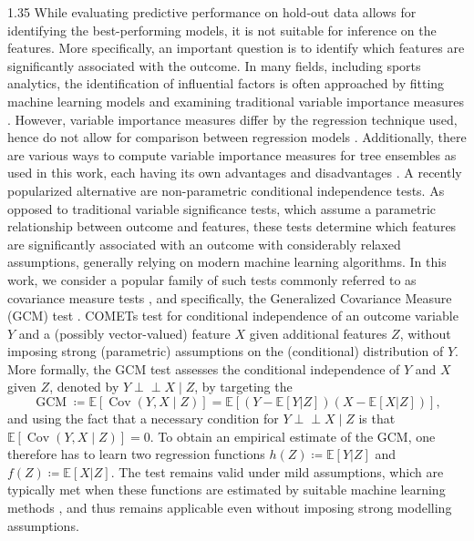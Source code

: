 \documentclass[12pt,a4paper]{article}
\begin{document}
\begin{spacing}{1.35}
While evaluating predictive performance on hold-out data allows for identifying the best-performing models, it is not suitable for inference on the features. More specifically, an important question is to identify which features are significantly associated with the outcome. %
In many fields, including sports analytics, the identification of influential factors is often approached by fitting machine learning models and examining traditional variable importance measures \citep{bajons2025mlsi}. However, variable importance measures differ by the regression technique used, hence do not allow for comparison between regression models \citep{williamson20varimp}. Additionally, there are various ways to compute variable importance measures for tree ensembles as used in this work, each having its own advantages and disadvantages \citep{Strobl08varimp}. A recently popularized alternative are non-parametric conditional independence tests. As opposed to traditional variable significance tests, which assume a parametric relationship between outcome and features, these tests determine which features are significantly associated with an outcome with considerably relaxed assumptions, generally relying on modern machine learning algorithms. In this work, we consider a popular family of such tests commonly referred to as covariance measure tests \citep[COMETs, see, e.g.,][]{kook24comets}, and specifically, the Generalized Covariance Measure (GCM) test \citep{Shah20gcm}. COMETs test for conditional independence of an outcome variable $Y$ and a (possibly vector-valued) feature $X$ given additional features $Z$, without imposing strong (parametric) assumptions on the (conditional) distribution of $Y$.
More formally, the GCM test assesses the conditional independence of $Y$ and $X$ given $Z$, denoted by $Y \perp\!\!\!\perp X \mid Z$, by targeting the 
\begin{equation}\label{eq:GCM}
\operatorname{GCM} \coloneqq \mathbb{E}[\operatorname{Cov}(Y,X \mid Z)] =\mathbb{E}[(Y -
\mathbb{E}[Y | Z])(X - \mathbb{E}[X | Z])],
\end{equation}
and using the fact that a necessary condition for $Y \perp\!\!\!\perp X \mid Z$ is that $\mathbb{E}[\operatorname{Cov}(Y,X \mid Z)] = 0$. To obtain an empirical estimate of the GCM, one therefore has to learn two regression functions $h(Z) \coloneqq \mathbb{E}[Y | Z]$ and $f(Z) \coloneqq \mathbb{E}[X | Z]$. The test remains valid under mild assumptions, which are typically met when these functions are estimated by suitable machine learning methods \citep{Shah20gcm}, and thus remains applicable even without imposing strong modelling assumptions.

\end{spacing}
\end{document}
